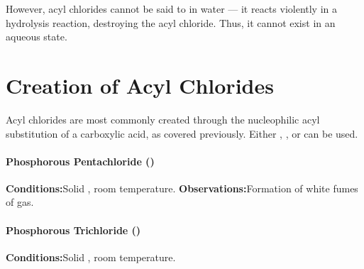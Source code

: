 		However, acyl chlorides cannot be said to  in water --- it reacts violently in a hydrolysis reaction, destroying the
		acyl chloride. Thus, it cannot exist in an aqueous state.




	\pagebreak
	\section{Creation of Acyl Chlorides}

		Acyl chlorides are most commonly created through the nucleophilic acyl substitution of a carboxylic acid, as covered previously.
		Either , , or  can be used.


		\paragraph{Phosphorous Pentachloride ()}

		\vspace{1.5em}
		\vbox{\textbf{Conditions:}\tabto{35mm}Solid , room temperature.}
		\vbox{\textbf{Observations:}\tabto{35mm}Formation of white fumes of  gas.}



		\paragraph{Phosphorous Trichloride ()}

		\vspace{1.5em}
		\vbox{\textbf{Conditions:}\tabto{35mm}Solid , room temperature.}



